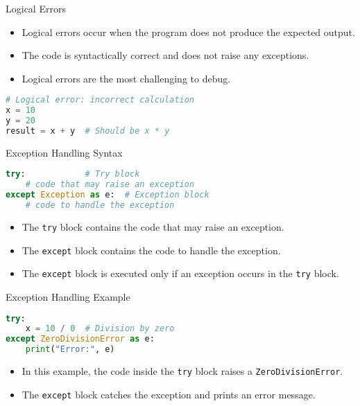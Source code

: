 \begin{frame}[fragile]{Logical Errors}
    \begin{itemize}
        \item Logical errors occur when the program does not produce the expected output.
        \item The code is syntactically correct and does not raise any exceptions.
        \item Logical errors are the most challenging to debug.
    \end{itemize}
    \begin{lstlisting}[style=colorful, language=Python]
# Logical error: incorrect calculation
x = 10
y = 20
result = x + y  # Should be x * y
    \end{lstlisting}
\end{frame} 

\begin{frame}[fragile]{Exception Handling Syntax}
    \begin{lstlisting}[style=colorful, language=Python]
try:            # Try block
    # code that may raise an exception
except Exception as e:  # Exception block
    # code to handle the exception
    \end{lstlisting}
    \begin{itemize}
        \item The \texttt{try} block contains the code that may raise an exception.
        \item The \texttt{except} block contains the code to handle the exception.
        \item The \texttt{except} block is executed only if an exception occurs in the \texttt{try} block.
    \end{itemize}
\end{frame}

\begin{frame}[fragile]{Exception Handling Example}
    \begin{lstlisting}[style=colorful, language=Python]
try:
    x = 10 / 0  # Division by zero
except ZeroDivisionError as e:
    print("Error:", e)
    \end{lstlisting}
    \begin{itemize}
        \item In this example, the code inside the \texttt{try} block raises a \texttt{ZeroDivisionError}.
        \item The \texttt{except} block catches the exception and prints an error message.
    \end{itemize}
\end{frame} 

